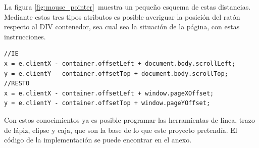 La figura \ref{fig:mouse_pointer} muestra un pequeño esquema de estas distancias. Mediante estos tres tipos atributos es posible averiguar la posición del ratón respecto al DIV contenedor, sea cual sea la situación de la página, con estas instrucciones.

\begin{verbatim}
//IE
x = e.clientX - container.offsetLeft + document.body.scrollLeft;
y = e.clientY - container.offsetTop + document.body.scrollTop;
//RESTO
x = e.clientX - container.offsetLeft + window.pageXOffset;
y = e.clientY - container.offsetTop + window.pageYOffset;
\end{verbatim}

Con estos conocimientos ya es posible programar las herramientas de línea, trazo de lápiz, elipse y caja, que son la base de lo que este proyecto pretendía. El código de la implementación se puede encontrar en el anexo. 






